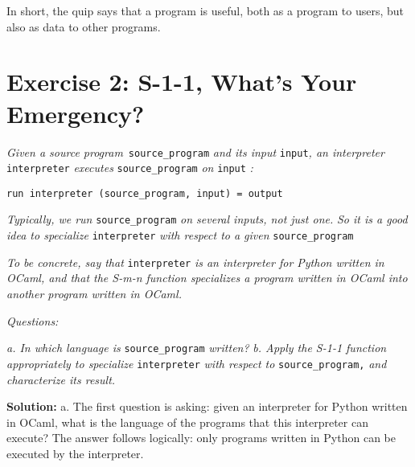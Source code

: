 \documentclass{article}
\begin{document}
In short, the quip says that a program is useful, both as a program to users, but also as data to other programs.


\newpage

\section{Exercise 2: S-1-1, What's Your Emergency?}

\textit{Given a source program} $\,$\verb+source_program+ \textit{and its input} \verb+input+\textit{, an interpreter} \verb+interpreter+ \textit{executes} \verb+source_program+ \textit{on} \verb+input+ \textit{:}
\begin{lstlisting}
run interpreter (source_program, input) = output
\end{lstlisting}

\textit{Typically, we run} \verb+source_program+ \textit{on several inputs, not just one.} 
\textit{So it is a good idea to specialize} \verb+interpreter+ \textit{with respect to a given} \verb+source_program+
\linebreak

\textit{To be concrete, say that} \verb+interpreter+ \textit{is an interpreter for Python written in OCaml, and that the S-m-n function specializes a program written in OCaml into another program written in OCaml.}
\linebreak

\textit{Questions:}

\textit{a. In which language is} \verb+source_program+ \textit{written?}
\linebreak
\textit{b. Apply the S-1-1 function appropriately to specialize } \verb+interpreter+ \textit{with respect to} \verb+source_program,+ \textit{and characterize its result.}
\linebreak \linebreak

\noindent \textbf{Solution:} \linebreak \linebreak
a. The first question is asking: given an interpreter for Python written in OCaml, what is the language of the programs that this interpreter can execute?
The answer follows logically: only programs written in Python can be executed by the interpreter.
\end{document}
